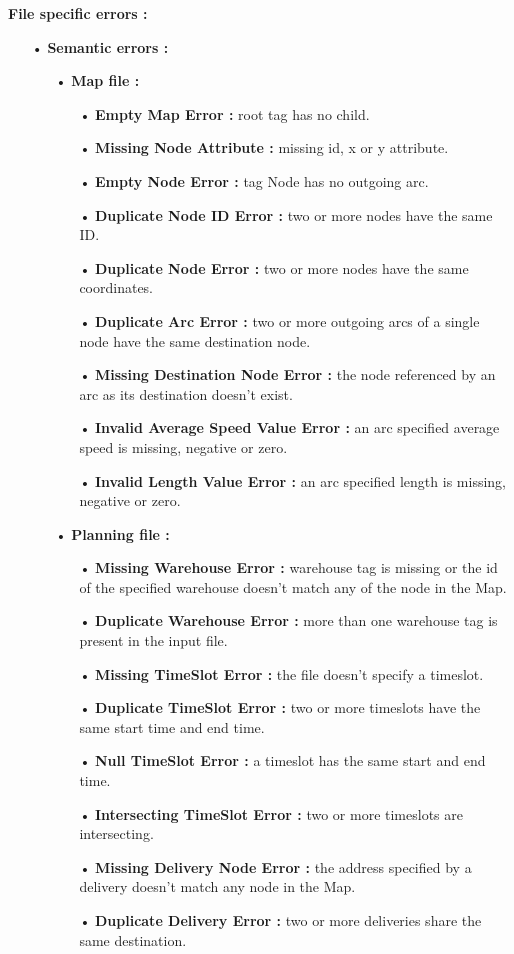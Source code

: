 \documentclass[paper=a4, fontsize=11pt]{report}
\numberwithin{equation}{section}		%
\numberwithin{figure}{section}		%
\numberwithin{table}{section}		%
\begin{document}
\textbf{File specific errors :}
\begin{itemize}
  \item[•] \textbf{Semantic errors :}
  \begin{itemize}
    \item[•] \textbf{Map file :}
    \begin{itemize}
      \item[•] \textbf{Empty Map Error :} root tag has no child.
      \item[•] \textbf{Missing Node Attribute :} missing id, x or y attribute.
      \item[•] \textbf{Empty Node Error :} tag Node has no outgoing arc.
      \item[•] \textbf{Duplicate Node ID Error :} two or more nodes have the same ID.
      \item[•] \textbf{Duplicate Node Error :} two or more nodes have the same coordinates.
      \item[•] \textbf{Duplicate Arc Error :} two or more outgoing arcs of a single node have the same destination node. 
      \item[•] \textbf{Missing Destination Node Error :} the node referenced by an arc as its destination doesn’t exist. 
      \item[•] \textbf{Invalid Average Speed Value Error :} an arc specified average speed is missing, negative or zero. 
      \item[•] \textbf{Invalid Length Value Error :} an arc specified length is missing, negative or zero.
    \end{itemize}

    \item[•] \textbf{Planning file :}
    \begin{itemize}
      \item[•] \textbf{Missing Warehouse Error :} warehouse tag is missing or the id of the specified warehouse doesn’t match any of the node in the Map.
      \item[•] \textbf{Duplicate Warehouse Error :} more than one warehouse tag is present in the input file.
      \item[•] \textbf{Missing TimeSlot Error :} the file doesn’t specify a timeslot.
      \item[•] \textbf{Duplicate TimeSlot Error :} two or more timeslots have the same start time and end time.
      \item[•] \textbf{Null TimeSlot Error :} a timeslot has the same start and end time.
      \item[•] \textbf{Intersecting TimeSlot Error :} two or more timeslots are intersecting.
      \item[•] \textbf{Missing Delivery Node Error :} the address specified by a delivery doesn’t match any node in the Map.
      \item[•] \textbf{Duplicate Delivery Error :} two or more deliveries share the same destination. 
    \end{itemize}
  \end{itemize}
\end{itemize}
\end{document}
